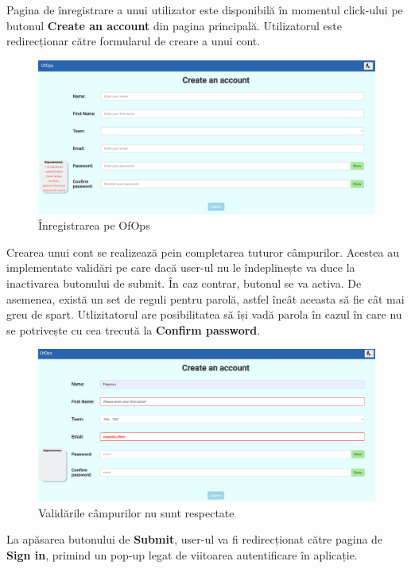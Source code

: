 Pagina de înregistrare a unui utilizator este disponibilă în momentul click-ului pe butonul \textbf{Create an account} din pagina principală. Utilizatorul este redirecționar către formularul de creare a unui cont.  

\begin{figure}[!htb]
    \centering
    \includegraphics[width=0.9\linewidth]{images/inregistrare.png}
    \caption{Înregistrarea pe OfOps}
    \label{fig:inregistrare}
\end{figure}

Crearea unui cont se realizează pein completarea tuturor câmpurilor. Acestea au implementate validări pe care dacă user-ul nu le îndeplinește va duce la inactivarea butonului de submit. În caz contrar, butonul se va activa. De asemenea, există un set de reguli pentru parolă, astfel încât aceasta să fie cât mai greu de spart. Utlizitatorul are posibilitatea să își vadă parola în cazul în care nu se potrivește cu cea trecută la \textbf{Confirm password}.

\begin{figure}[!htb]
    \centering
    \includegraphics[width=0.9\linewidth]{images/greseli.png}
    \caption{Validările câmpurilor nu sunt respectate}
    \label{fig:greseli}
\end{figure}

La apăsarea butonului de \textbf{Submit}, user-ul va fi redirecționat către pagina de \textbf{Sign in}, primind un pop-up legat de viitoarea autentificare în aplicație.  

